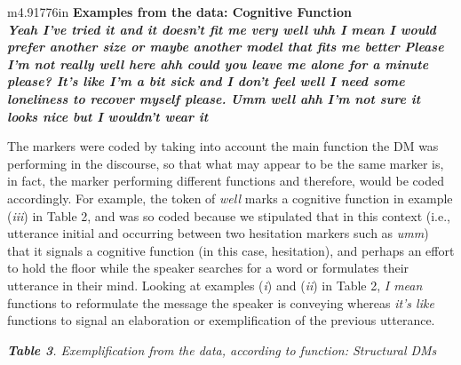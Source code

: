 \documentclass[12pt]{article}
\newcommand\textstyleListLabelxix[1]{\textup{#1}}
\newcommand\textstyleListLabell[1]{\textup{#1}}
\newenvironment{styleStandard}{\setlength\leftskip{0cm}\setlength\rightskip{0cm plus 1fil}\setlength\parindent{0cm}\setlength\parfillskip{0pt plus 1fil}\setlength\parskip{0in plus 1pt}\writerlistparindent\writerlistleftskip\leavevmode\normalfont\normalsize\writerlistlabel\ignorespaces}{\unskip\vspace{0.111in plus 0.0111in}\par}
\newcommand\writerlistleftskip{}
\newcommand\writerlistparindent{}
\newcommand\writerlistlabel{}
\newcommand\writerlistremovelabel{\aftergroup\let\aftergroup\writerlistparindent\aftergroup\relax\aftergroup\let\aftergroup\writerlistlabel\aftergroup\relax}
\newcounter{listWWNumxleveli}
\renewcommand\thelistWWNumxleveli{\arabic{listWWNumxleveli}}
\newcommand\labellistWWNumxleveli{\textstyleListLabelxix{\thelistWWNumxleveli.}}
\newenvironment{listWWNumxleveli}{\def\writerlistleftskip{\addtolength\leftskip{0.0cm}}\def\writerlistparindent{}\def\writerlistlabel{}\def\item{\def\writerlistparindent{\setlength\parindent{-0cm}}\def\writerlistlabel{\stepcounter{listWWNumxleveli}\makebox[0cm][l]{\labellistWWNumxleveli}\hspace{0cm}\writerlistremovelabel}}}{}
\newcounter{listWWNumxxxvileveli}
\renewcommand\thelistWWNumxxxvileveli{\arabic{listWWNumxxxvileveli}}
\newcommand\labellistWWNumxxxvileveli{\textstyleListLabell{\thelistWWNumxxxvileveli.}}
\newenvironment{listWWNumxxxvileveli}{\def\writerlistleftskip{\addtolength\leftskip{0.0cm}}\def\writerlistparindent{}\def\writerlistlabel{}\def\item{\def\writerlistparindent{\setlength\parindent{-0cm}}\def\writerlistlabel{\stepcounter{listWWNumxxxvileveli}\makebox[0cm][l]{\labellistWWNumxxxvileveli}\hspace{0cm}\writerlistremovelabel}}}{}
\begin{document}
\begin{flushleft}
\tablehead{}
\begin{supertabular}{m{4.91776in}}
\hline
\bfseries Examples from the data: Cognitive Function\\\hline
\setcounter{listWWNumxxxvileveli}{0}
\begin{listWWNumxxxvileveli}
\item 
\textit{Yeah I’ve tried it and it doesn’t fit me very well uhh I mean I would prefer another size or maybe another model that fits me better}\end{listWWNumxxxvileveli}
\setcounter{listWWNumxleveli}{0}
\begin{listWWNumxleveli}
\item 
\textit{Please I’m not really well here ahh could you leave me alone for a minute please? It’s like I’m a bit sick and I don’t feel well I need some loneliness to recover myself please.}\item 
\textit{Umm well ahh I’m not sure it looks nice but I wouldn’t wear it}\end{listWWNumxleveli}
\\\hline
\end{supertabular}
\end{flushleft}
\begin{styleStandard}
The markers were coded by taking into account the main function the DM was performing in the discourse, so that what may appear to be the same marker is, in fact, the marker performing different functions and therefore, would be coded accordingly. For example, the token of \textit{well} marks a cognitive function in example (\textit{iii}) in Table 2, and was so coded because we stipulated that in this context (i.e., utterance initial and occurring between two hesitation markers such as \textit{umm}) that it signals a cognitive function (in this case, hesitation), and perhaps an effort to hold the floor while the speaker searches for a word or formulates their utterance in their mind. Looking at examples (\textit{i}) and (\textit{ii}) in Table 2, \textit{I mean} functions to reformulate the message the speaker is conveying whereas \textit{it’s like }functions to signal an elaboration or exemplification of the previous utterance. 
\end{styleStandard}

\begin{styleStandard}
\textbf{\textit{Table 3}}\textit{. Exemplification from the data, according to function: Structural DMs}
\end{styleStandard}
\end{document}
